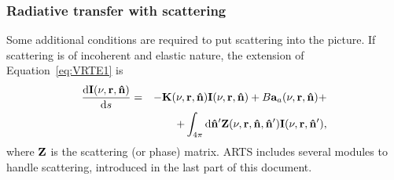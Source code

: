 \subsubsection{Radiative transfer with scattering}
%
Some additional conditions are required to put scattering into the picture. If
scattering is of incoherent and elastic nature, the extension of 
Equation~\ref{eq:VRTE1} is
\begin{eqnarray}
  \label{eq:VRTE2}
  \frac {\mathrm{d}{\bf I}(\nu,{\bf r},{\bf \hat{n}})}{\mathrm{d} s} &=&
    -{\bf K}(\nu,{\bf r},{\bf \hat{n}}) {\bf I}(\nu,{\bf r},{\bf \hat{n}}) +
     B{\bf a}_{a}(\nu,{\bf r},{\bf \hat{n}}) + \\ \nonumber
    &&+ \int_{4\pi} \mathrm{d}{\bf \hat{n}}' {\bf Z}(\nu,{\bf r},{\bf \hat{n}},{\bf \hat{n}}')
    {\bf I}(\nu,{\bf r},{\bf \hat{n}}'),
\end{eqnarray}
where ${\bf Z}$ is the scattering (or phase) matrix.  ARTS includes several
modules to handle scattering, introduced in the last part of this document.\\





